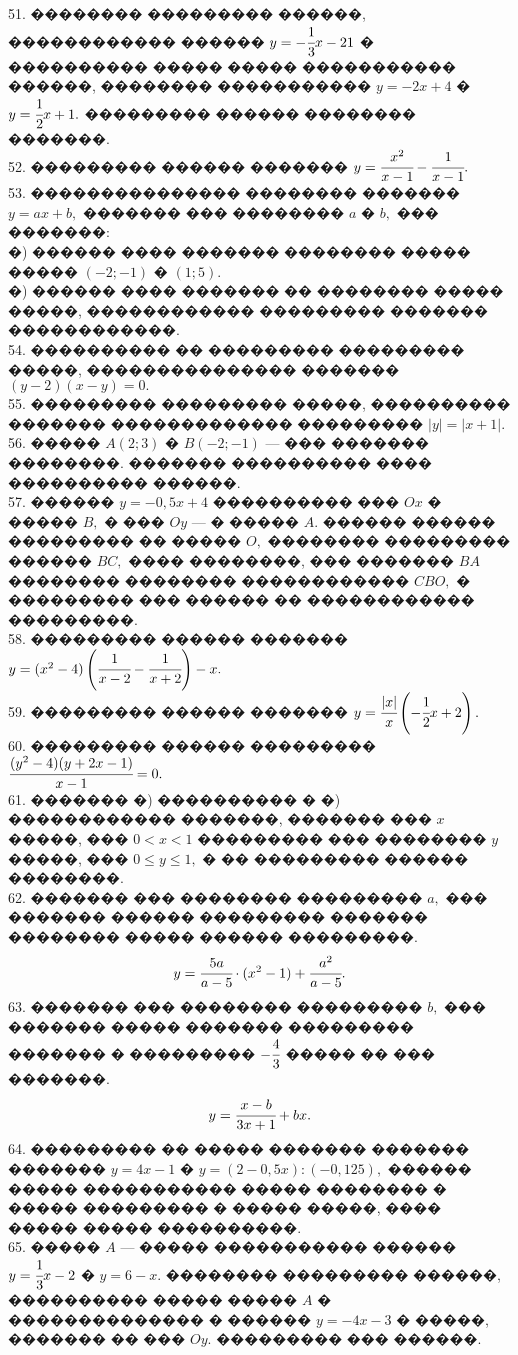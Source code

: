 \documentclass[12pt]{article}
\begin{document}
51. �������� ��������� ������, ������������ ������ $y=-\cfrac{1}{3}x-21$  � ���������� ����� ����� ����������� ������, �������� ����������� $y=-2x+4$ � $y=\cfrac{1}{2}x+1.$ ��������� ������ �������� �������.\\
52. ��������� ������ ������� $y=\cfrac{x^2}{x-1}-\cfrac{1}{x-1}.$\\
53. ��������������� �������� ������� $y=ax+b,$ ������� ��� �������� $a$ � $b,$ ��� �������:\\
�) ������ ���� ������� �������� ����� ����� $(-2;-1)$ � $(1;5).$\\
�) ������ ���� ������� �� �������� ����� �����, ������������ ��������� ������� ������������.\\
54. ���������� �� ��������� ��������� �����, ��������������� ������� $(y-2)(x-y)=0.$\\
55. ��������� ��������� �����, ���������� ������� ������������� ��������� $|y|=|x+1|.$\\
56. ����� $A(2;3)$ � $B(-2;-1)$ --- ��� ������� ��������. ������� ���������� ���� ���������� ������.\\
57. ������ $y=-0,5x+4$ ���������� ��� $Ox$ � ����� $B,$ � ��� $Oy$ --- � ����� $A.$ ������ ������ ��������� �� ����� $O,$ �������� ��������� ������ $BC,$ ���� ��������, ��� ������� $BA$ �������� �������� ������������ $CBO,$ � ��������� ��� ������ �� ������������ ���������.\\
58. ��������� ������ ������� $y=(x^2-4)\left(\cfrac{1}{x-2}-\cfrac{1}{x+2}\right)-x.$\\
59. ��������� ������ ������� $y=\cfrac{|x|}{x}\left(-\cfrac{1}{2}x+2\right).$\\
60. ��������� ������ ��������� $\cfrac{(y^2-4)(y+2x-1)}{x-1}=0.$\\
61. ������� �) ���������� � �) ������������ �������, ������� ��� $x$ �����, ��� $0<x<1$ ��������� ��� �������� $y$ �����, ��� $0\le y\le1,$ � �� ��������� ������ ��������.\\
62. ������� ��� �������� ��������� $a,$ ��� ������� ������ ��������� ������� �������� ����� ������ ���������.
$$y=\cfrac{5a}{a-5}\cdot(x^2-1)+\cfrac{a^2}{a-5}.$$
63. ������� ��� �������� ��������� $b,$ ��� ������� ����� ������� ��������� ������� � ��������� $-\cfrac{4}{3}$ ����� �� ��� �������.
$$y=\cfrac{x-b}{3x+1}+bx.$$
64. ��������� �� ����� ������� ������� ������� $y=4x-1$ � $y=(2-0,5x): (-0,125),$
������ ����� ����������� ����� �������� � ����� ��������� � ����� �����, ���� ����� ����� ����������.\\
65. ����� $A$ --- ����� ����������� ������ $y=\cfrac{1}{3}x-2$ � $y=6-x.$ �������� ��������� ������, ���������� ����� ����� $A$ � �������������� � ������ $y=-4x-3$ � �����, ������� �� ��� $Oy.$ ��������� ��� ������.\\
\end{document}
